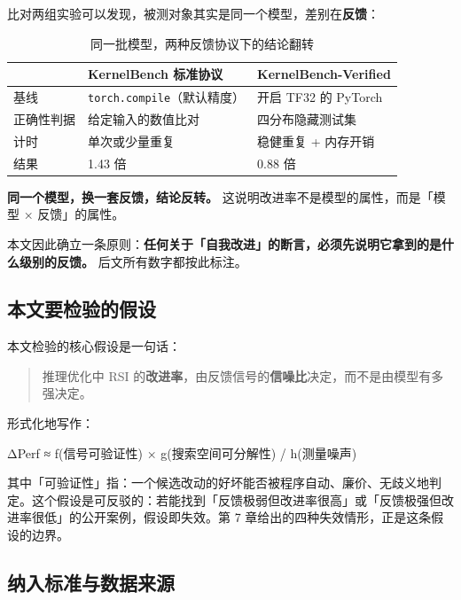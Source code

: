 比对两组实验可以发现，被测对象其实是同一个模型，差别在\textbf{反馈}：


\begin{table}[t]
\centering
\footnotesize
\setlength{\tabcolsep}{4pt}
\caption{同一批模型，两种反馈协议下的结论翻转}
\label{tab:1}
\begin{tabular}{lll}
\toprule
 & KernelBench 标准协议 & KernelBench-Verified \\
\midrule
基线 & \texttt{torch.compile}（默认精度） & 开启 TF32 的 PyTorch \\
正确性判据 & 给定输入的数值比对 & 四分布隐藏测试集 \\
计时 & 单次或少量重复 & 稳健重复 + 内存开销 \\
结果 & 1.43 倍 & 0.88 倍 \\
\bottomrule
\end{tabular}
\end{table}

\textbf{同一个模型，换一套反馈，结论反转。} 这说明改进率不是模型的属性，而是「模型 × 反馈」的属性。


本文因此确立一条原则：\textbf{任何关于「自我改进」的断言，必须先说明它拿到的是什么级别的反馈。} 后文所有数字都按此标注。


\subsection{本文要检验的假设}

本文检验的核心假设是一句话：


\begin{quote}\small
推理优化中 RSI 的\textbf{改进率}，由反馈信号的\textbf{信噪比}决定，而不是由模型有多强决定。

\end{quote}

形式化地写作：


    ΔPerf ≈ f(信号可验证性) × g(搜索空间可分解性) / h(测量噪声)


其中「可验证性」指：一个候选改动的好坏能否被程序自动、廉价、无歧义地判定。这个假设是可反驳的：若能找到「反馈极弱但改进率很高」或「反馈极强但改进率很低」的公开案例，假设即失效。第 7 章给出的四种失效情形，正是这条假设的边界。


\subsection{纳入标准与数据来源}

